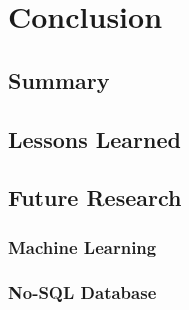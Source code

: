 \chapter{Conclusion}
\label{ChapterSeven}


\section{Summary}
\label{sec:Summary}

\section{Lessons Learned}
\label{sec:LessonsLearned}

\section{Future Research}
\label{sec:FutureResearch}

\subsection{Machine Learning}
\label{subsec:MachineLearning}

\subsection{No-SQL Database}
\label{subsec:NoSQLDatabase}